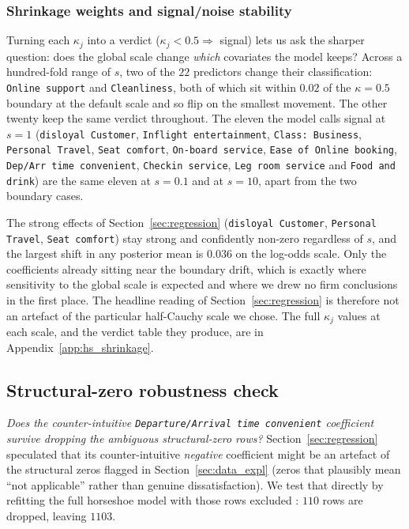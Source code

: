 \subsubsection{Shrinkage weights and signal/noise stability}
Turning each $\kappa_j$ into a verdict ($\kappa_j < 0.5 \Rightarrow$ signal)
lets us ask the sharper question: does the global scale change \emph{which}
covariates the model keeps? Across a hundred-fold range of $s$, two of the
$22$ predictors change their classification: \texttt{Online support} and
\texttt{Cleanliness}, both of which sit within $0.02$ of the $\kappa = 0.5$
boundary at the default scale and so flip on the smallest movement. The other
twenty keep the same verdict throughout. The eleven the model calls signal at
$s = 1$ (\texttt{disloyal Customer}, \texttt{Inflight entertainment},
\texttt{Class: Business}, \texttt{Personal Travel}, \texttt{Seat comfort},
\texttt{On-board service}, \texttt{Ease of Online booking},
\texttt{Dep/Arr time convenient}, \texttt{Checkin service},
\texttt{Leg room service} and \texttt{Food and drink}) are the same eleven
at $s = 0.1$ and at $s = 10$, apart from the two boundary cases.

The strong effects of Section~\ref{sec:regression}
(\texttt{disloyal Customer}, \texttt{Personal Travel}, \texttt{Seat comfort})
stay strong and confidently non-zero regardless of $s$, and the largest shift
in any posterior mean is $0.036$ on the log-odds scale. Only the coefficients
already sitting near the boundary drift, which is exactly where sensitivity to
the global scale is expected and where we drew no firm conclusions in the first
place. The headline reading of Section~\ref{sec:regression} is therefore not an
artefact of the particular half-Cauchy scale we chose. The full
$\kappa_j$ values at each scale, and the verdict table they produce, are in
Appendix~\ref{app:hs_shrinkage}.

\subsection{Structural-zero robustness check}
\label{sec:sens-structzero}\label{sec:robustness}
\emph{Does the counter-intuitive \texttt{Departure/Arrival time convenient}
coefficient survive dropping the ambiguous structural-zero rows?}
Section~\ref{sec:regression} speculated that its
counter-intuitive \emph{negative} coefficient might be an artefact of
the structural zeros flagged in Section~\ref{sec:data_expl} (zeros that plausibly mean
``not applicable'' rather than genuine dissatisfaction). We test that
directly by refitting the full horseshoe model with those rows excluded
: $110$ rows are
dropped, leaving $1103$.

